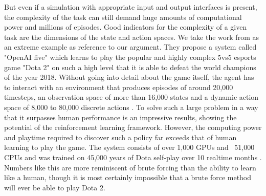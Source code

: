 \par
But even if a simulation with appropriate input and output interfaces is present, the complexity of the task can still demand huge amounts of computational power and millions of episodes. Good indicators for the complexity of a given task are the dimensions of the state and action spaces. We take the work from \cite{berner2019dota} as an extreme example as reference to our argument. They propose a system called "OpenAI five" which learns to play the popular and highly complex 5vs5 esports game "Dota 2" on such a high level that it is able to defeat the world champions of the year 2018. Without going into detail about the game itself, the agent has to interact with an environment that produces episodes of around 20,000 timesteps, an observation space of more than 16,000 states and a dynamic action space of 8,000 to 80,000 discrete actions \cite[p.~3]{berner2019dota}. To solve such a large problem in a way that it surpasses human performance is an impressive results, showing the potential of the reinforcement learning framework. However, the computing power and playtime required to discover such a policy far exceeds that of human learning to play the game. The system consists of over 1,000 GPUs and ~51,000 CPUs \cite[p.~3]{berner2019dota} and was trained on 45,000 years of Dota self-play over 10 realtime months \cite[]{OpenAI_dota}.
Numbers like this are more reminiscent of brute forcing than the ability to learn like a human, though it is most certainly impossible that a brute force method will ever be able to play Dota 2.